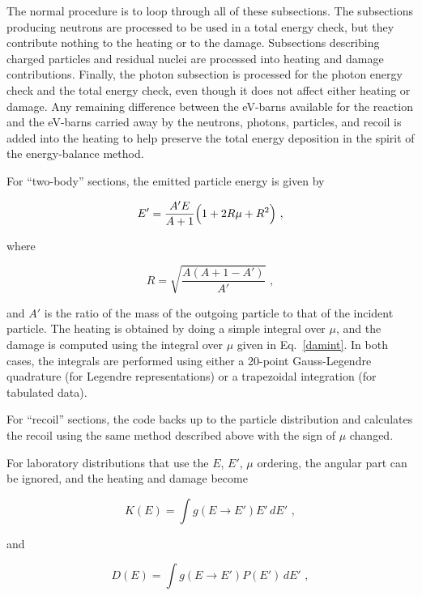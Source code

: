 \noindent
The normal procedure is to loop through all of these subsections.
The subsections producing neutrons are processed to be used in
a total energy check, but they contribute nothing to the heating
or to the damage. Subsections describing charged particles and
residual nuclei are processed into heating and damage contributions.
Finally, the photon subsection is processed for the photon energy
check and the total energy check, even though it does not affect
either heating or damage.  Any remaining difference between the
eV-barns available for the reaction and the eV-barns carried
away by the neutrons, photons, particles, and recoil is added
into the heating to help preserve the total energy deposition
in the spirit of the energy-balance method.

For ``two-body'' sections,  the emitted particle energy is given by

\begin{equation}
   E'=\frac{A'E}{A+1}\Bigl(1+2R\mu+R^2\Bigr) \,\,,
\label{ebar6}
\end{equation}
\vspace{1 pt}

\noindent
where

\begin{equation}
   R=\sqrt{\frac{A(A+1-A')}{A'}} \,\,,
\label{beta}
\end{equation}

\noindent
and $A'$ is the ratio of the mass of the outgoing particle to
that of the incident particle.  The heating is obtained by doing
a simple integral over $\mu$, and the damage is computed using
the integral over $\mu$ given in Eq.~\ref{damint}.  In both
cases, the integrals are performed using either a 20-point
Gauss-Legendre quadrature
(for Legendre representations) or a trapezoidal integration
(for tabulated data).

For ``recoil'' sections, the code backs up to the particle
distribution and calculates the recoil using  the same method
described above with the sign of $\mu$ changed.

For laboratory distributions that use the $E$, $E'$, $\mu$
ordering, the angular part can be ignored, and the heating and
damage become

\begin{equation}
   K(E)=\int g(E{\rightarrow}E')E'\,dE'\,\,,
\label{KofE}
\end{equation}

\noindent
and

\begin{equation}
   D(E)=\int g(E{\rightarrow}E')P(E')\,dE'\,\,,
\label{DofE}
\end{equation}

